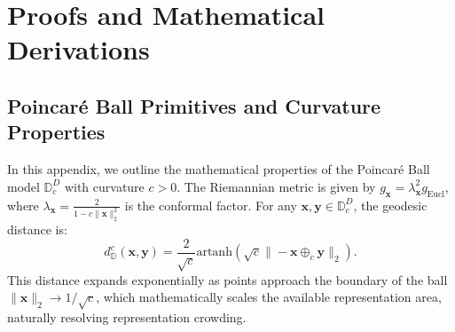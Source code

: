 \documentclass{article}
\theoremstyle{plain}
\theoremstyle{definition}
\theoremstyle{remark}
\begin{document}

\printAffiliationsAndNotice{}











\newpage
\appendix
\onecolumn
\section{Proofs and Mathematical Derivations}

\subsection{Poincaré Ball Primitives and Curvature Properties}
In this appendix, we outline the mathematical properties of the Poincaré Ball model $\mathbb{D}_c^D$ with curvature $c > 0$. The Riemannian metric is given by $g_{\mathbf{x}} = \lambda_{\mathbf{x}}^2 g_{\text{Eucl}}$, where $\lambda_{\mathbf{x}} = \frac{2}{1 - c\|\mathbf{x}\|_2^2}$ is the conformal factor. For any $\mathbf{x}, \mathbf{y} \in \mathbb{D}_c^D$, the geodesic distance is:
\begin{equation}
d_{\mathbb{D}}^c(\mathbf{x}, \mathbf{y}) = \frac{2}{\sqrt{c}} \text{artanh}\left( \sqrt{c} \|\!-\mathbf{x} \oplus_c \mathbf{y}\|_2 \right).
\end{equation}
This distance expands exponentially as points approach the boundary of the ball $\|\mathbf{x}\|_2 \to 1/\sqrt{c}$, which mathematically scales the available representation area, naturally resolving representation crowding.
\end{document}
